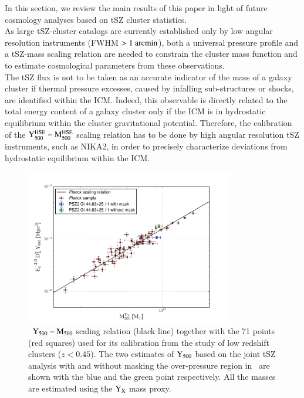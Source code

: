 \documentclass[traditabstract]{aa}
\begin{document}
In this section, we review the main results of this paper in light of future cosmology analyses based on tSZ cluster statistics.\\
\indent As large tSZ-cluster catalogs are currently established only by low angular resolution instruments (FWHM $>1~\rm{arcmin}$), both a universal pressure profile and a tSZ-mass scaling relation are needed to constrain the cluster mass function and to estimate cosmological parameters from these observations.\\
\indent The tSZ flux is not to be taken as an accurate indicator of the mass of a galaxy cluster if thermal pressure excesses, caused by infalling sub-structures or shocks, are identified within the ICM. Indeed, this observable is directly related to the total energy content of a galaxy cluster only if the ICM is in hydrostatic equilibrium within the cluster gravitational potential. Therefore, the calibration of the $\rm{Y_{500}^{\rm{HSE}}}-\rm{M_{500}^{\rm{HSE}}}$ scaling relation has to be done by high angular resolution tSZ instruments, such as NIKA2, in order to precisely characterize deviations from hydrostatic equilibrium within the ICM.\\
\begin{figure}[h!]
\centering
\includegraphics[height=6.8cm]{Scaling_relation.pdf}
\caption{{\footnotesize \planck\  $\rm{Y_{500}}-\rm{M_{500}}$ scaling relation (black line) \citep{pla14} together with the 71 points (red squares) used for its calibration from the study of low redshift clusters ($z < 0.45$). The two estimates of $\rm{Y_{500}}$ based on the joint tSZ analysis with and without masking the over-pressure region in \psz\ are shown with the blue and the green point respectively. All the masses are estimated using the $\rm{Y_X}$ mass proxy.}}
\label{fig:scaling_law}
\end{figure}
\end{document}
